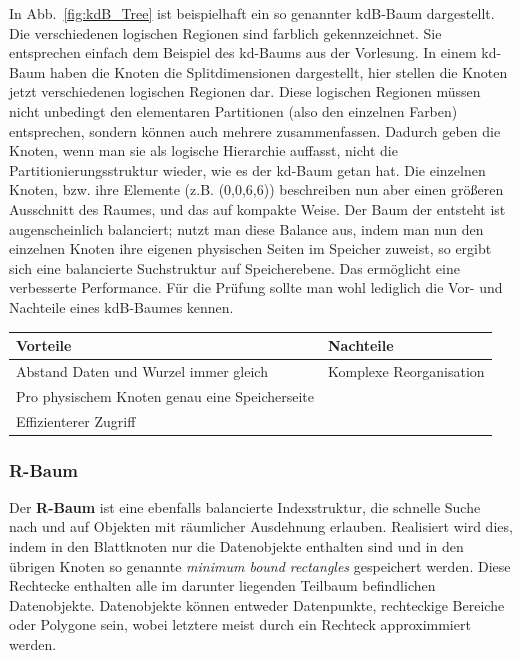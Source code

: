 In Abb.~\ref{fig:kdB_Tree} ist beispielhaft ein so genannter kdB-Baum dargestellt.
Die verschiedenen logischen Regionen sind farblich gekennzeichnet. Sie entsprechen
einfach dem Beispiel des kd-Baums aus der Vorlesung. In einem kd-Baum
haben die Knoten die Splitdimensionen dargestellt, hier stellen die Knoten jetzt 
verschiedenen logischen Regionen dar.
Diese logischen Regionen müssen nicht unbedingt den elementaren Partitionen
(also den einzelnen Farben) entsprechen, sondern können auch mehrere 
zusammenfassen. Dadurch geben die Knoten, wenn man sie als logische
Hierarchie auffasst, nicht die Partitionierungsstruktur wieder, wie es der kd-Baum
getan hat. Die einzelnen Knoten, bzw. ihre Elemente (z.B. (0,0,6,6)) beschreiben
nun aber einen größeren Ausschnitt des Raumes, und das auf kompakte Weise.
Der Baum der entsteht ist augenscheinlich balanciert; nutzt man diese Balance aus,
indem man nun den einzelnen Knoten ihre eigenen physischen Seiten im Speicher
zuweist, so ergibt sich eine balancierte Suchstruktur auf Speicherebene. Das ermöglicht eine
verbesserte Performance.
Für die Prüfung sollte man wohl lediglich die Vor- und Nachteile eines kdB-Baumes
kennen.

\begin{table}[thbp]
    \centering
\begin{tabular}{p{5cm} l}
	\toprule
	Vorteile & Nachteile \\
	\midrule
	Abstand Daten und Wurzel immer gleich & Komplexe Reorganisation \\
	Pro physischem Knoten genau eine Speicherseite & \\
	Effizienterer Zugriff & \\
	\bottomrule
\end{tabular}
\end{table}

\subsubsection{R-Baum}
Der \textbf{R-Baum} ist eine ebenfalls balancierte Indexstruktur, die schnelle Suche nach und
auf Objekten mit räumlicher Ausdehnung erlauben. Realisiert wird dies, indem
in den Blattknoten nur die Datenobjekte enthalten sind und in den übrigen Knoten
so genannte \textit{minimum bound rectangles} gespeichert werden. Diese Rechtecke
enthalten alle im darunter liegenden Teilbaum befindlichen Datenobjekte. Datenobjekte
können entweder Datenpunkte, rechteckige Bereiche oder Polygone sein, wobei letztere
meist durch ein Rechteck approximmiert werden.

